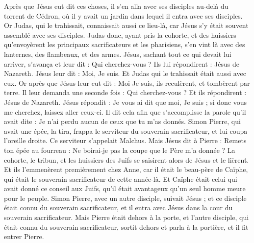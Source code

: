 \begin{multicols}{2}
\VerseOne{}Après que Jésus eut dit ces choses, il s'en alla avec ses disciples au-delà du torrent de Cédron, où il y avait un jardin dans lequel il entra avec ses disciples.
Or Judas, qui le trahissait, connaissait aussi ce lieu-là, car Jésus s'y était souvent assemblé avec ses disciples.
Judas donc, ayant pris la cohorte, et des huissiers qu'envoyèrent les principaux sacrificateurs et les pharisiens, s'en vint là avec des lanternes, des flambeaux, et des armes.
Jésus, sachant tout ce qui devait lui arriver, s'avança et leur dit : Qui cherchez-vous ?
Ils lui répondirent : Jésus de Nazareth. Jésus leur dit : Moi, Je suis. Et Judas qui le trahissait était aussi avec eux.
Or après que Jésus leur eut dit : Moi Je suis, ils reculèrent, et tombèrent par terre.
Il leur demanda une seconde fois : Qui cherchez-vous ? Et ils répondirent : Jésus de Nazareth.
Jésus répondit : Je vous ai dit que moi, Je suis ; si donc vous me cherchez, laissez aller ceux-ci.
Il dit cela afin que s'accomplisse la parole qu'il avait dite : Je n'ai perdu aucun de ceux que tu m'as donnés.
Simon Pierre, qui avait une épée, la tira, frappa le serviteur du souverain sacrificateur, et lui coupa l'oreille droite. Ce serviteur s'appelait Malchus.
Mais Jésus dit à Pierre : Remets ton épée au fourreau : Ne boirai-je pas la coupe que le Père m'a donnée ?
La cohorte, le tribun, et les huissiers des Juifs se saisirent alors de Jésus et le lièrent.
Et ils l'emmenèrent premièrement chez Anne, car il était le beau-père de Caïphe, qui était le souverain sacrificateur de cette année-là.
Et Caïphe était celui qui avait donné ce conseil aux Juifs, qu'il était avantageux qu'un seul homme meure pour le peuple.
Simon Pierre, avec un autre disciple, suivait Jésus ; et ce disciple était connu du souverain sacrificateur, et il entra avec Jésus dans la cour du souverain sacrificateur.
Mais Pierre était dehors à la porte, et l'autre disciple, qui était connu du souverain sacrificateur, sortit dehors et parla à la portière, et il fit entrer Pierre.

\end{multicols}
